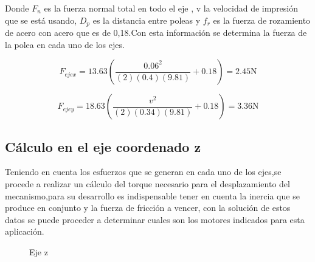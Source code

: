 Donde $F_n$ es la fuerza normal total en todo el eje , v la velocidad de impresión que se está usando, $D_p$ es la distancia entre poleas y $f_r$ es la fuerza de rozamiento de acero con acero que es de 0,18.Con esta información se determina la fuerza de la polea en cada uno de los ejes.

\[F_{ejex}=13.63(\frac{0.06^2}{(2)(0.4)(9.81)}+0.18)=2.45 \text{N}\]

\[F_{ejey}=18.63(\frac{v^2}{(2)(0.34)(9.81)}+0.18)=3.36 \text{N}\]

\subsection{Cálculo en el eje coordenado z}

Teniendo en cuenta los esfuerzos que se generan en cada uno de los ejes,se procede a realizar un cálculo del torque necesario para el desplazamiento del mecanismo,para su desarrollo es indispensable tener en cuenta la inercia que se produce en conjunto y la fuerza de fricción a vencer, con la solución de estos datos se puede proceder a determinar cuales son los motores indicados para esta aplicación.

\begin{figure}[H]
    \centering
    \caption{Eje z}
    \label{fig:eje z}
\end{figure}

